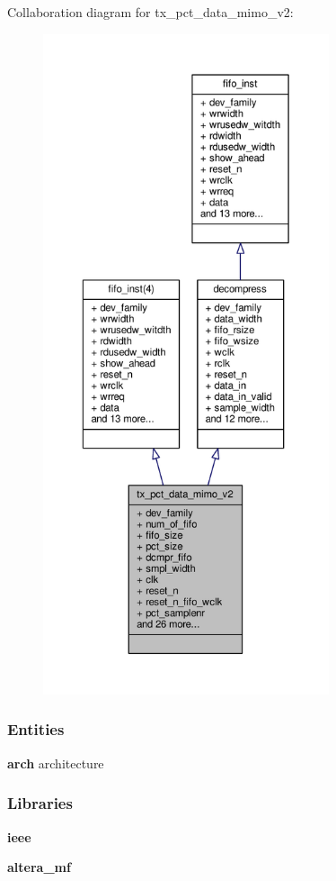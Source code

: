 Collaboration diagram for tx\+\_\+pct\+\_\+data\+\_\+mimo\+\_\+v2\+:\nopagebreak
\begin{figure}[H]
\begin{center}
\leavevmode
\includegraphics[height=550pt]{d7/d10/classtx__pct__data__mimo__v2__coll__graph}
\end{center}
\end{figure}
\subsubsection*{Entities}
\begin{DoxyCompactItemize}
\item 
{\bf arch} architecture
\end{DoxyCompactItemize}
\subsubsection*{Libraries}
 \begin{DoxyCompactItemize}
\item 
{\bf ieee} 
\item 
{\bf altera\+\_\+mf} 
\end{DoxyCompactItemize}
